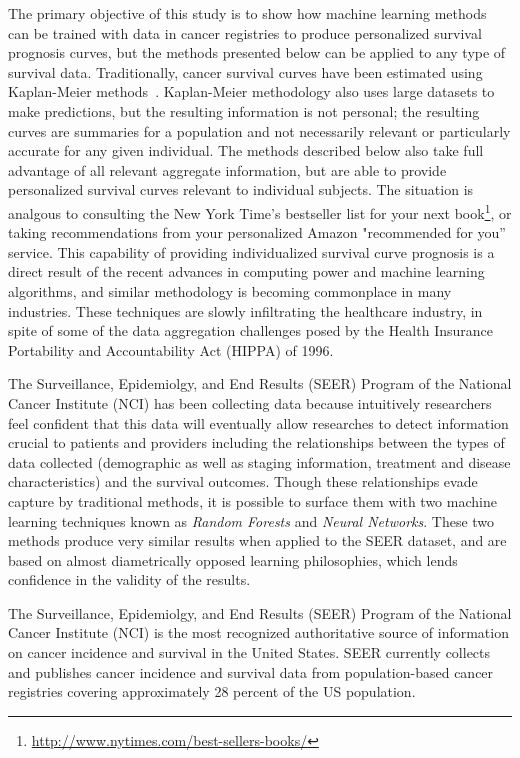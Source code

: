 \documentclass[a4paper,11pt]{article}
\begin{document}
The primary objective of this study is to show how machine learning methods can be trained with data in cancer registries to produce personalized survival prognosis curves, but the methods presented below can be applied to any type of survival data. Traditionally, cancer survival curves have been estimated using Kaplan-Meier methods~\cite{cam}. Kaplan-Meier methodology also uses large datasets to make predictions, but the resulting information is not personal; the resulting curves are summaries for a population and not necessarily relevant or particularly accurate for any given individual.  The methods described below also take full advantage of all relevant aggregate information, but are able to provide personalized survival curves relevant to individual subjects. 
The situation is analgous to consulting the New York Time's bestseller list for your next book\footnote{\url{http://www.nytimes.com/best-sellers-books/}}, or taking recommendations from your personalized Amazon "recommended for you'' service.
This capability of providing individualized survival curve prognosis is a direct result of the recent advances in computing power and machine learning algorithms, and similar methodology is becoming commonplace in many industries.
 These techniques are slowly infiltrating the healthcare industry, in spite of some of the data aggregation challenges posed by the Health Insurance Portability and Accountability Act (HIPPA) of 1996.



The Surveillance, Epidemiolgy, and End Results (SEER) Program of the National Cancer Institute (NCI) has been collecting data because intuitively 
researchers feel confident
 that this data will eventually allow researches to detect information crucial to patients and providers including the relationships between the types of data collected (demographic as well as staging information, treatment and disease characteristics) and the survival outcomes.
Though these relationships evade capture by traditional methods, it is possible to surface them with two machine learning techniques known as \emph{Random Forests} and \emph{Neural Networks}. These two methods produce very similar results when applied to the SEER dataset, and are based on almost diametrically opposed learning philosophies, which lends confidence in the validity of the results.

The Surveillance, Epidemiolgy, and End Results (SEER) Program of the National Cancer Institute (NCI) is the most recognized authoritative source of information on cancer incidence and survival in the United States. SEER currently collects and publishes cancer incidence and survival data from population-based cancer registries covering approximately 28 percent of the US population.
\end{document}
